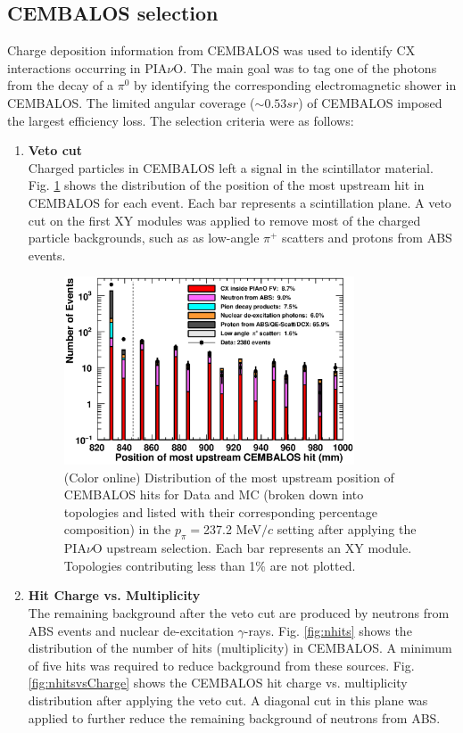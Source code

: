 \subsection{CEMBALOS selection}
Charge deposition information from CEMBALOS was used to identify CX interactions occurring in PIA$\nu$O. The main goal was to tag one of the photons from the decay of a $\pi^0$ by identifying the corresponding electromagnetic shower in CEMBALOS. The limited angular coverage ($\sim0.53 sr$) of CEMBALOS imposed the largest efficiency loss. The selection criteria were as follows:
\begin{enumerate}
\item{\bf Veto cut\\}
Charged particles in CEMBALOS left a signal in the scintillator material. Fig. \ref{fig:veto} shows the distribution of the position of the most upstream hit in CEMBALOS for each event. Each bar represents a scintillation plane. A veto cut on the first XY modules was applied to remove most of the charged particle backgrounds, such as as low-angle $\pi^+$ scatters and protons from ABS events.

\begin{figure}[ht]
 \includegraphics[width=86mm]{figures/duettag_fgdMostUp_10000_forpaper_v4.eps}
 \caption{(Color online) Distribution of the most upstream position of CEMBALOS hits for Data and MC (broken down into topologies and listed with their corresponding percentage composition) in the $p_\pi=$237.2 MeV$/c$ setting after applying the PIA$\nu$O upstream selection. Each bar represents an XY module. Topologies contributing less than 1\% are not plotted.}
 \label{fig:veto}
\end{figure}
   
\item{\bf Hit Charge vs. Multiplicity\\}
The remaining background after the veto cut are produced by neutrons from ABS events and nuclear de-excitation $\gamma$-rays. Fig. \ref{fig:nhits} shows the distribution of the number of hits (multiplicity) in CEMBALOS. A minimum of five hits was required to reduce background from these sources. Fig. \ref{fig:nhitsvsCharge} shows the CEMBALOS hit charge vs. multiplicity distribution after applying the veto cut. A diagonal cut in this plane was applied to further reduce the remaining background of neutrons from ABS.
\end{enumerate}

